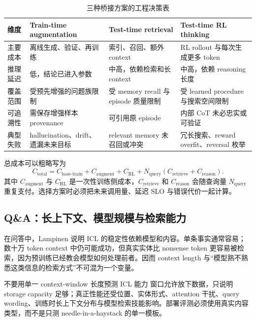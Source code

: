 \begin{table}[H]
\centering
\small
\caption{三种桥接方案的工程决策表}
\begin{tabularx}{\textwidth}{L{0.18\textwidth}X X X}
\toprule
维度 & Train-time augmentation & Test-time retrieval & Test-time RL thinking \\
\midrule
主要成本 & 离线生成、验证、再训练 & 索引、召回、额外 context & RL rollout 与每次生成更多 token \\
推理延迟 & 低，结论已进入参数 & 中高，依赖检索和长 context & 中高，依赖 reasoning 长度 \\
覆盖范围 & 受预先增强的问题族限制 & 受 memory recall 与 episode 质量限制 & 受 learned procedure 与搜索空间限制 \\
可追溯性 & 需保存增强样本 provenance & 可引用原 episode & 内部 CoT 未必忠实或可验证 \\
典型失败 & hallucination、drift、遗漏未来目标 & relevant memory 未召回或冲突 & 冗长搜索、reward overfit、reversal 枚举 \\
\bottomrule
\end{tabularx}
\end{table}

总成本可以粗略写为
$$
C_{\text{total}}=
C_{\text{base-train}}+C_{\text{augment}}+C_{\text{RL}}
+N_{\text{query}}\left(C_{\text{retrieve}}+C_{\text{reason}}\right).
$$
其中 $C_{\text{augment}}$ 与 $C_{\text{RL}}$ 是一次性训练侧成本，$C_{\text{retrieve}}$ 和 $C_{\text{reason}}$ 会随查询量 $N_{\text{query}}$ 重复支付。选择方案时必须把未来调用量、延迟 SLO 与错误代价一起计算。

\subsection{Q\&A：长上下文、模型规模与检索能力}

在问答中，Lampinen 说明 ICL 的稳定性依赖模型和内容。单条事实通常容易；数十万 token context 中仍可能成功，但真实实体比 nonsense token 更容易被检索，因为预训练已经教会模型如何处理前者。因而 context length 与“模型熟不熟悉这类信息的检索方式”不可混为一个变量。


\begin{warningbox}{不要用单一 context-window 长度预测 ICL 能力}
窗口允许放下数据，只说明 storage capacity 足够；真正性能还受位置、实体形式、attention 干扰、query wording、训练时长上下文分布与模型检索技能影响。部署评测必须使用真实内容类型，而不是只测 needle-in-a-haystack 的单一模板。
\end{warningbox}

